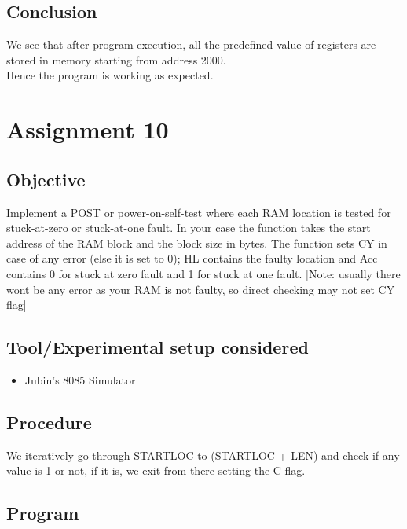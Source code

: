 \documentclass[a4paper]{article} %
\begin{document}
    \subsection{Conclusion}
        We see that after program execution, all the predefined value of registers are stored in memory starting from address 2000.\\
        Hence the program is working as expected.
\newpage

\section[POST to check stuck at 1 fault]{Assignment 10} %
    \subsection{Objective}
        Implement a POST or power-on-self-test  where each RAM location is tested for stuck-at-zero or stuck-at-one fault. 
        In your case the function takes the start address of the RAM block and the block size in bytes.
        The function sets CY in case of any error (else it is set to 0); HL contains the faulty location and Acc contains 0 for stuck at zero fault and 1 for stuck at one fault.
        [Note: usually there wont be any error as your RAM is not faulty, so direct checking may not set CY flag]
    \subsection{Tool/Experimental setup considered}
        \begin{itemize}
            \item Jubin's 8085 Simulator
        \end{itemize}
    \subsection{Procedure}
        We iteratively go through STARTLOC to (STARTLOC + LEN) and check if any value is 1 or not, if it is, we exit from there setting the C flag.
    \subsection{Program}
        
        \newpage
\end{document}
